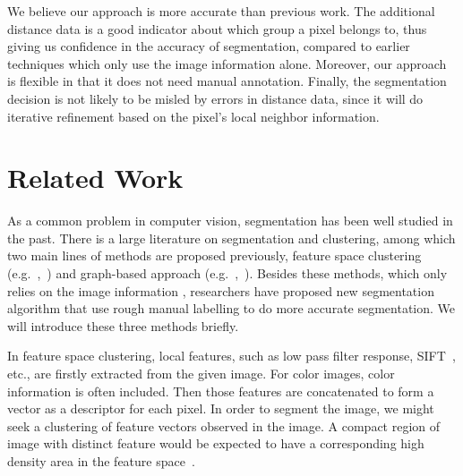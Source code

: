 \documentclass{article} %
\begin{document}
We believe our approach is more accurate than previous work. The additional 
distance data is a good indicator about which group a pixel belongs to, 
thus giving us confidence in the accuracy of segmentation, compared to earlier
 techniques which only use the image information alone. Moreover, our
 approach is flexible in that it does not need manual annotation. Finally, the
segmentation decision is not likely to be misled by errors in distance
data, since it will do iterative refinement based on the pixel's local
neighbor information.

\section{Related Work}
As a common problem in computer vision, segmentation has been well
studied in the past. There is a large literature on segmentation and
clustering, among which two main lines of methods are proposed
previously, feature space clustering
(e.g.~\citep{Comaniciu1997featurespace},~\citep{Comaniciu1999meanshift})
and graph-based approach
(e.g.~\citep{Shi1997normalizedcuts},~\citep{Wu1993optimalgraph}).
Besides these methods, which only relies on the image
information , researchers have proposed new segmentation algorithm
that use rough manual labelling to do more accurate segmentation. We
will introduce these three methods briefly.


In feature space clustering, local features, such as low pass filter
response, SIFT~\citep{Lowe2004sift}, etc., are firstly extracted from
the given image. For color images, color information is often
included. Then those features are concatenated to form a vector as a
descriptor for each pixel. In order to segment the image, we might
seek a clustering of feature vectors observed in the image. A compact
region of image with distinct feature would be expected to have a
corresponding high density area in the feature
space~\citep{Boykov2006graph}. 


\end{document}
